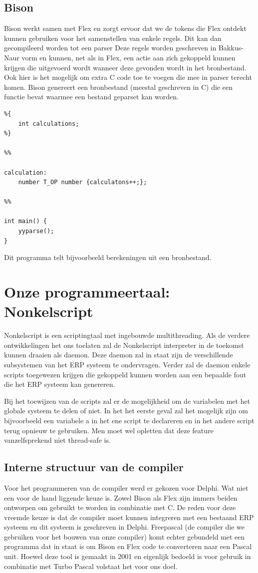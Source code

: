 \documentclass[11pt,a4paper]{article}
\begin{document}
\subsection{Bison}
Bison werkt samen met Flex en zorgt ervoor dat we de tokens die Flex ontdekt kunnen gebruiken voor het samenstellen van enkele regels. Dit kan dan gecompileerd worden tot een parser Deze regels worden geschreven in Bakkus-Naur vorm en kunnen, net als in Flex, een actie aan zich gekoppeld kunnen krijgen die uitgevoerd wordt wanneer deze gevonden wordt in het bronbestand. Ook hier is het mogelijk om extra C code toe te voegen die mee in parser terecht komen. Bison genereert een bronbestand (meestal geschreven in C) die een functie bevat waarmee een bestand geparset kan worden.

\begin{verbatim}
%{
	int calculations;
%}

%%

calculation:
	number T_OP number {calculatons++;};

%%

int main() {
	yyparse();
}
\end{verbatim}

Dit programma telt bijvoorbeeld berekeningen uit een bronbestand.

\section{Onze programmeertaal: Nonkelscript}
Nonkelscript is een scriptingtaal met ingebouwde multithreading. Als de verdere ontwikkelingen het ons toelaten zal de Nonkelscript interpreter in de toekomst kunnen draaien als daemon. Deze daemon zal in staat zijn de verschillende subsystemen van het ERP systeem te ondervragen. Verder zal de daemon enkele scripts toegewezen krijgen die gekoppeld kunnen worden aan een bepaalde fout die het ERP systeem kan genereren.

Bij het toewijzen van de scripts zal er de mogelijkheid om de variabelen met het globale systeem te delen of niet. In het het eerste geval zal het mogelijk zijn om bijvoorbeeld een variabele a in het ene script te declareren en in het andere script terug opnieuw te gebruiken. Men moet wel opletten dat deze feature vanzelfsprekend niet thread-safe is.

\subsection{Interne structuur van de compiler}
Voor het programmeren van de compiler werd er gekozen voor Delphi. Wat niet een voor de hand liggende keuze is. Zowel Bison als Flex zijn immers beiden ontworpen om gebruikt te worden in combinatie met C. De reden voor deze vreemde keuze is dat de compiler moet kunnen integreren met een bestaand ERP systeem en dit systeem is geschreven in Delphi. Freepascal (de compiler die we gebruiken voor het bouwen van onze compiler) komt echter gebundeld met een programma dat in staat is om Bison en Flex code te converteren naar een Pascal unit. Hoewel deze tool is gemaakt in 2001 en eigenlijk bedoeld is voor gebruik in combinatie met Turbo Pascal volstaat het voor ons doel.
\end{document}
